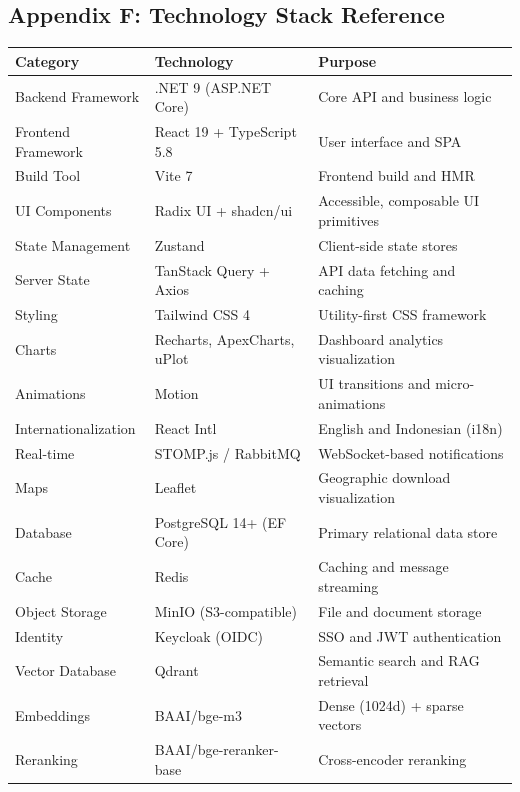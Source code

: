 \subsection{Appendix F: Technology Stack Reference}

\begin{tabularx}{\textwidth}{@{} l l X @{}}
  \toprule
  \textbf{Category} & \textbf{Technology}
    & \textbf{Purpose} \\
  \midrule
  Backend Framework & .NET 9 (ASP.NET Core)
    & Core API and business logic \\
  Frontend Framework & React 19 + TypeScript 5.8
    & User interface and SPA \\
  Build Tool & Vite 7
    & Frontend build and HMR \\
  UI Components & Radix UI + shadcn/ui
    & Accessible, composable UI primitives \\
  State Management & Zustand
    & Client-side state stores \\
  Server State & TanStack Query + Axios
    & API data fetching and caching \\
  Styling & Tailwind CSS 4
    & Utility-first CSS framework \\
  Charts & Recharts, ApexCharts, uPlot
    & Dashboard analytics visualization \\
  Animations & Motion
    & UI transitions and micro-animations \\
  Internationalization & React Intl
    & English and Indonesian (i18n) \\
  Real-time & STOMP.js / RabbitMQ
    & WebSocket-based notifications \\
  Maps & Leaflet
    & Geographic download visualization \\
  Database & PostgreSQL 14+ (EF Core)
    & Primary relational data store \\
  Cache & Redis
    & Caching and message streaming \\
  Object Storage & MinIO (S3-compatible)
    & File and document storage \\
  Identity & Keycloak (OIDC)
    & SSO and JWT authentication \\
  Vector Database & Qdrant
    & Semantic search and RAG retrieval \\
  Embeddings & BAAI/bge-m3
    & Dense (1024d) + sparse vectors \\
  Reranking & BAAI/bge-reranker-base
    & Cross-encoder reranking \\

\end{tabularx}
